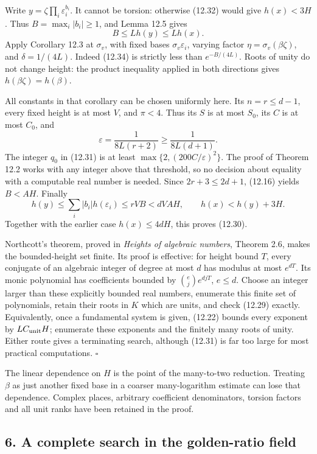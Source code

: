 \documentclass[
  11pt,
  a4paper,
]{article}
\begin{document}
Write \(y=\zeta\prod_i\varepsilon_i^{b_i}\). It cannot be torsion:
otherwise (12.32) would give \(h(x)<3H\). Thus \(B=\max_i|b_i|\ge1\),
and Lemma 12.5 gives \[
B\le Lh(y)\le Lh(x).
\] Apply Corollary 12.3 at \(\sigma_v\), with fixed bases
\(\sigma_v\varepsilon_i\), varying factor \(\eta=\sigma_v(\beta\zeta)\),
and \(\delta=1/(4L)\). Indeed (12.34) is strictly less than
\(e^{-B/(4L)}\). Roots of unity do not change height: the product
inequality applied in both directions gives \(h(\beta\zeta)=h(\beta)\).

All constants in that corollary can be chosen uniformly here. Its
\(n=r\le d-1\), every fixed height is at most \(V\), and \(\pi<4\). Thus
its \(S\) is at most \(S_0\), its \(C\) is at most \(C_0\), and \[
\varepsilon=\frac{1}{8L(r+2)}
\ge\frac{1}{8L(d+1)}.
\] The integer \(q_0\) in (12.31) is at least
\(\max\{2,(200C/\varepsilon)^2\}\). The proof of Theorem 12.2 works with
any integer above that threshold, so no decision about equality with a
computable real number is needed. Since \(2r+3\le2d+1\), (12.16) yields
\(B<AH\). Finally \[
h(y)\le\sum_i|b_i|h(\varepsilon_i)
      \le rVB<dVAH,\qquad
h(x)<h(y)+3H.
\tag{12.35}
\] Together with the earlier case \(h(x)\le4dH\), this proves (12.30).

Northcott's theorem, proved in \emph{Heights of algebraic numbers},
Theorem 2.6, makes the bounded-height set finite. Its proof is
effective: for height bound \(T\), every conjugate of an algebraic
integer of degree at most \(d\) has modulus at most \(e^{dT}\). Its
monic polynomial has coefficients bounded by \(\binom ej e^{djT}\),
\(e\le d\). Choose an integer larger than these explicitly bounded real
numbers, enumerate this finite set of polynomials, retain their roots in
\(K\) which are units, and check (12.29) exactly. Equivalently, once a
fundamental system is given, (12.22) bounds every exponent by
\(LC_{\rm unit}H\); enumerate these exponents and the finitely many
roots of unity. Either route gives a terminating search, although
(12.31) is far too large for most practical computations. \(\square\)

The linear dependence on \(H\) is the point of the many-to-two
reduction. Treating \(\beta\) as just another fixed base in a coarser
many-logarithm estimate can lose that dependence. Complex places,
arbitrary coefficient denominators, torsion factors and all unit ranks
have been retained in the proof.

\subsection{6. A complete search in the golden-ratio
field}\label{a-complete-search-in-the-golden-ratio-field}
\end{document}
